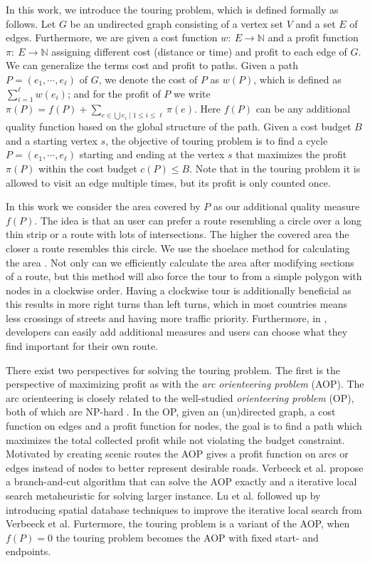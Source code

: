 \documentclass[sigconf,natbib=false]{acmart}
\begin{document}
In this work, we introduce the touring problem, which is defined formally as follows. 
Let $G$ be an undirected graph consisting of a vertex set $V$ and a set $E$ of edges. Furthermore, we are given a cost function $w{:}\ E \rightarrow \mathbb{N}$ and a profit function $\pi{:}\ E \rightarrow \mathbb{N}$ assigning different cost (distance or time) and profit to each edge of $G$.
We can generalize the terms cost and profit to paths. 
Given a path $P = (e_1, \cdots, e_{\ell})$ of $G$, we denote the cost of $P$ as $w(P)$, which is defined as $\sum_{i=1}^{\ell} w(e_i)$; and for the profit of $P$ we write $\pi(P) = f(P) + \sum_{ e \in \bigcup{e_i \mid 1 \leq i \leq \ell } } \pi(e)$.
Here $f(P)$ can be any additional quality function based on the global structure of the path.
Given a cost budget $B$ and a starting vertex $s$, the objective of touring problem is to find a cycle $P=(e_1, \cdots, e_{\ell})$ starting and ending at the vertex $s$ that maximizes the profit $\pi(P)$ within the cost budget $c(P) \leq B$. 
Note that in the touring problem it is allowed to visit an edge multiple times, but its profit is only counted once.

In this work we consider the area covered by $P$ as our additional quality measure $f(P)$. The idea is that an user can prefer a route resembling a circle over a long thin strip or a route with lots of intersections. The higher the covered area the closer a route resembles this circle. 
We use the shoelace method for calculating the area \cite{meister1769generalia}. 
Not only can we efficiently calculate the area after modifying sections of a route, but this method will also force the tour to from a simple polygon with nodes in a clockwise order.
Having a clockwise tour is additionally beneficial as this results in more right turns than left turns, which in most countries means less crossings of streets and having more traffic priority.
Furthermore, in \tM, developers can easily add additional measures and users can choose what they find important for their own route.

There exist two perspectives for solving the touring problem. The first is the perspective of maximizing profit as with the \emph{arc orienteering problem} (AOP). The arc orienteering is closely related to the well-studied \emph{orienteering problem} (OP), both of which are NP-hard \cite{chekuri2012improved, bansal2004approximation, blum2007approximation}.
In the OP, given an (un)directed graph, a cost function on edges and a profit function for nodes, the goal is to find a path which maximizes the total collected profit while not violating the budget constraint.
Motivated by creating scenic routes the AOP gives a profit function on arcs or edges instead of nodes to better represent desirable roads.
Verbeeck et al. \cite{verbeeck2014extension} propose a branch-and-cut algorithm that can solve the AOP exactly and a iterative local search metaheuristic for solving larger instance.
Lu et al. \cite{lu2015arc} followed up by introducing spatial database techniques to improve the iterative local search from Verbeeck et al.
Furtermore, the touring problem is a variant of the AOP, when $f(P) = 0$ the touring problem becomes the AOP with fixed start- and endpoints.
\end{document}
